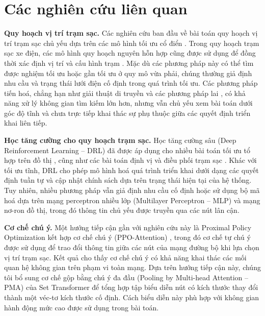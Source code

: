 \documentclass[10pt, conference, a4paper, compsocconf]{IEEEtran}
\begin{document}
\section{Các nghiên cứu liên quan}
\label{sec:related}

\textbf{Quy hoạch vị trí trạm sạc.} Các nghiên cứu ban đầu về bài toán quy hoạch vị trí trạm sạc chủ yếu dựa trên các mô hình tối ưu cổ điển \cite{hakimi1964optimum}. Trong quy hoạch trạm sạc xe điện, các mô hình quy hoạch nguyên hỗn hợp cũng được sử dụng để đồng thời xác định vị trí và cấu hình trạm \cite{veisi2025optimal, truc2024electric}. Mặc dù các phương pháp này có thể tìm được nghiệm tối ưu hoặc gần tối ưu ở quy mô vừa phải, chúng thường giả định nhu cầu và trạng thái lưới điện cố định trong quá trình tối ưu. Các phương pháp tiến hoá, chẳng hạn như giải thuật di truyền và các phương pháp lai \cite{zhou2022location, kumar2024hybrid}, có khả năng xử lý không gian tìm kiếm lớn hơn, nhưng vẫn chủ yếu xem bài toán dưới góc độ tĩnh và chưa trực tiếp khai thác sự phụ thuộc giữa các quyết định triển khai liên tiếp.

\textbf{Học tăng cường cho quy hoạch trạm sạc.} Học tăng cường sâu (Deep Reinforcement Learning -- DRL) đã được áp dụng cho nhiều bài toán tối ưu tổ hợp trên đồ thị \cite{dai2017learning}, cũng như các bài toán định vị và điều phối trạm sạc \cite{ioannou2025deep, padmanabhan2021optimal, von2022reinforcement}. Khác với tối ưu tĩnh, DRL cho phép mô hình hoá quá trình triển khai dưới dạng các quyết định tuần tự và cập nhật chính sách dựa trên trạng thái hiện tại của hệ thống. Tuy nhiên, nhiều phương pháp vẫn giả định nhu cầu cố định hoặc sử dụng bộ mã hoá dựa trên mạng perceptron nhiều lớp (Multilayer Perceptron -- MLP) và mạng nơ-ron đồ thị, trong đó thông tin chủ yếu được truyền qua các nút lân cận.

\textbf{Cơ chế chú ý.} Một hướng tiếp cận gần với nghiên cứu này là Proximal Policy Optimization kết hợp cơ chế chú ý (PPO-Attention) \cite{liu2023optimal}, trong đó cơ chế tự chú ý được sử dụng để trao đổi thông tin giữa các nút của mạng đường bộ khi lựa chọn vị trí trạm sạc. Kết quả cho thấy cơ chế chú ý có khả năng khai thác các mối quan hệ không gian trên phạm vi toàn mạng. Dựa trên hướng tiếp cận này, chúng tôi bổ sung cơ chế gộp bằng chú ý đa đầu (Pooling by Multi-head Attention -- PMA) của Set Transformer \cite{lee2019set} để tổng hợp tập biểu diễn nút có kích thước thay đổi thành một véc-tơ kích thước cố định. Cách biểu diễn này phù hợp với không gian hành động mức cao được sử dụng trong bài toán.
\end{document}
